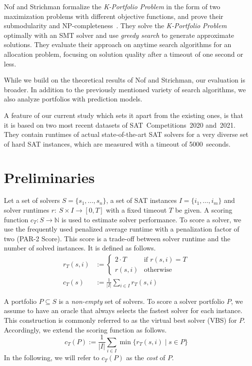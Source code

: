 \documentclass[conference]{IEEEtran}
\begin{document}
Nof and Strichman formalize the \emph{K-Portfolio Problem} in the form of two maximization problems with different objective functions, and prove their submodularity and NP-completeness~\cite{nof2020real}. 
They solve the \emph{K-Portfolio Problem} optimally with an SMT solver and use \emph{greedy search} to generate approximate solutions.
They evaluate their approach on anytime search algorithms for an allocation problem, focusing on solution quality after a timeout of one second or less.

While we build on the theoretical results of Nof and Strichman, our evaluation is broader. 
In addition to the previously mentioned variety of search algorithms, we also analyze portfolios with prediction models.

A feature of our current study which sets it apart from the existing ones, is that it is based on two most recent datasets of SAT~Competitions~2020 and~2021. 
They contain runtimes of actual state-of-the-art SAT solvers for a very diverse set of hard SAT instances, which are measured with a timeout of 5000~seconds.

\section{Preliminaries}
\label{sec:preliminaries}

Let a set of solvers $S = \{s_1, \dots, s_n\}$, a set of SAT instances $I = \{i_1, \dots, i_m\}$ and solver runtimes $r:~S \times I \rightarrow [0, T]$ with a fixed timeout $T$ be given.
A scoring function $c_T : S \rightarrow \mathbb{N}$ is used to estimate solver performance. 
To score a solver, we use the frequently used penalized average runtime with a penalization factor of two (PAR-2 Score). 
This score is a trade-off between solver runtime and the number of solved instances.
It is defined as follows.%
\begin{align}
r_T(s,i) &:= \begin{cases}
	2 \cdot T & \text{if }r(s,i) = T\\
	r(s,i) & \text{otherwise}
\end{cases} \tag*{Penalized Runtimes}\\[.5em]
c_T(s) &:= \frac{1}{|I|} \sum_{i \in I}{r_T(s,i)} \tag*{PAR-2 Score}
\end{align}

A portfolio $P \subseteq S$ is a \emph{non-empty} set of solvers.
To score a solver portfolio $P$, we assume to have an oracle that always selects the fastest solver for each instance. 
This construction is commonly referred to as the virtual best solver (VBS) for $P$. 
Accordingly, we extend the scoring function as follows.%
$$
	c_{T}(P) := \frac{1}{|I|} \sum\limits_{i \in I}{\min\{r_T(s,i) \mid s \in P\}}
$$
In the following, we will refer to $c_{T}(P)$ as the \emph{cost} of $P$. 
\end{document}

